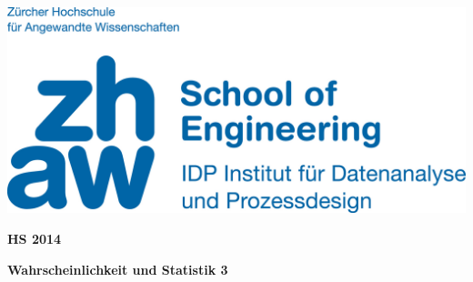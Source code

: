 \noindent
\begin{minipage}[t]{0.4\textwidth} 
\includegraphics[width=\linewidth]{logo.jpg}
\end{minipage}%
\hfill%
\begin{minipage}[t]{0.4\textwidth}\raggedleft
\textbf{\large HS 2014}
\end{minipage}

\begin{center}
 \textbf{\large Wahrscheinlichkeit und Statistik 3} \\
 \vspace{0.3cm}
\end{center}
